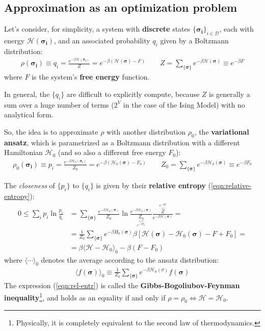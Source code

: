 \documentclass[../template.tex]{subfiles}
\begin{document}
\subsection{Approximation as an optimization problem}
Let's consider, for simplicity, a system with \textbf{discrete} states $\{\bm{\sigma_i}\}_{i \in \mathcal{D}}$, each with energy $\mathcal{H}(\bm{\sigma_i})$, and an associated probability $q_i$ given by a Boltzmann distribution:
\begin{align*}
    \rho(\bm{\sigma_i}) \equiv q_i = \frac{e^{-\beta \mathcal{H}(\bm{\sigma_i})}}{Z} = e^{-\beta(\mathcal{H}(\bm{\sigma})-F)} \qquad Z = \sum_{\{\bm{\sigma}\}} e^{-\beta \mathcal{H}(\bm{\sigma})}\equiv e^{-\beta F}
\end{align*}
where $F$ is the system's \textbf{free energy} function.

\medskip

In general, the $\{q_i\}$ are difficult to explicitly compute, because $Z$ is generally a sum over a huge number of terms ($2^V$ in the case of the Ising Model) with no analytical form.

\medskip

So, the idea is to approximate $\rho$ with another  distribution $\rho_0$, the \textbf{variational ansatz}, which is parametrized as a Boltzmann distribution with a different Hamiltonian $\mathcal{H}_0$ (and so also a different free energy $F_0$):
\begin{align}\label{eqn:variational-ansatz}
    \rho_0(\bm{\sigma_i}) \equiv p_i = \frac{e^{-\beta \mathcal{H}_0(\bm{\sigma_i})}}{Z_0} = e^{-\beta(\mathcal{H}_0(\bm{\sigma})-F_0)} \qquad Z_0 = \sum_{\{\bm{\sigma}\}} e^{-\beta \mathcal{H}_0(\bm{\sigma})} \equiv e^{-\beta F_0}
\end{align}

The \textit{closeness} of $\{p_i\}$ to $\{q_i\}$ is given by their \textbf{relative entropy} (\ref{eqn:relative-entropy}):
\begin{align} \nonumber
    0 \leq \sum_i p_i \ln \frac{p_i}{q_i} &= \sum_{\{\bm{\sigma}\}} \frac{e^{-\beta \mathcal{H}_0 (\bm{\sigma})}}{Z_0} \ln \frac{e^{-\beta \mathcal{H}_0(\bm{\sigma}) }}{\underbrace{Z_0}_{e^{-\beta F_0}} } \frac{\overbrace{Z}^{e^{-\beta F}} }{e^{-\beta \mathcal{H}(\bm{\sigma})}}  = \\
    &=  \nonumber
    \frac{1}{Z_0} \sum_{\{\bm{\sigma}\}} e^{-\beta H_0(\bm{\sigma})} \beta[\mathcal{H}(\bm{\sigma}) - \mathcal{H}_0(\bm{\sigma}) - F + F_0] =\\
    &= \beta \langle \mathcal{H}-\mathcal{H}_0 \rangle_0 - \beta (F-F_0) \label{eqn:rel-entr}
\end{align} 
where $\langle \cdots \rangle_0$ denotes the average according to the ansatz distribution:
\begin{align*}
    \langle f(\bm{\sigma}) \rangle_0 \equiv \frac{1}{Z_0} \sum_{\{\bm{\sigma}\}} e^{-\beta \mathcal{H}_0(\sigma)} f(\bm{\sigma})
\end{align*}
The expression (\ref{eqn:rel-entr}) is called the \textbf{Gibbs-Bogoliubov-Feynman inequality}\footnote{Physically, it is completely equivalent to the second law of thermodynamics.}, and holds as an equality if and only if $\rho = \rho_0 \Leftrightarrow \mathcal{H} = \mathcal{H}_0$. 
\end{document}
